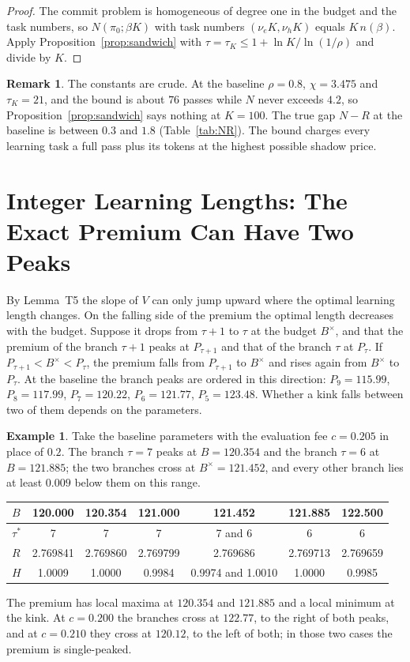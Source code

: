\documentclass[11pt]{article}
\theoremstyle{definition}
\newtheorem{example}{Example}
\newtheorem{remark}{Remark}
\begin{document}
\begin{proof}
The commit problem is homogeneous of degree one in the budget and the task numbers, so $N(\pi_0;\beta K)$ with task numbers $(\nu_eK,\nu_hK)$ equals $K\,n(\beta)$. Apply Proposition~\ref{prop:sandwich} with $\tau=\tau_K\le1+\ln K/\ln(1/\rho)$ and divide by $K$.
\end{proof}

\begin{remark}
The constants are crude. At the baseline $\rho=0.8$, $\chi=3.475$ and $\tau_K=21$, and the bound is about $76$ passes while $N$ never exceeds $4.2$, so Proposition~\ref{prop:sandwich} says nothing at $K=100$. The true gap $N-R$ at the baseline is between $0.3$ and $1.8$ (Table~\ref{tab:NR}). The bound charges every learning task a full pass plus its tokens at the highest possible shadow price.
\end{remark}

\section{Integer Learning Lengths: The Exact Premium Can Have Two Peaks}

By Lemma~T5 the slope of $V$ can only jump upward where the optimal learning length changes. On the falling side of the premium the optimal length decreases with the budget. Suppose it drops from $\tau+1$ to $\tau$ at the budget $B^\times$, and that the premium of the branch $\tau+1$ peaks at $P_{\tau+1}$ and that of the branch $\tau$ at $P_\tau$. If $P_{\tau+1}<B^\times<P_\tau$, the premium falls from $P_{\tau+1}$ to $B^\times$ and rises again from $B^\times$ to $P_\tau$. At the baseline the branch peaks are ordered in this direction: $P_9=115.99$, $P_8=117.99$, $P_7=120.22$, $P_6=121.77$, $P_5=123.48$. Whether a kink falls between two of them depends on the parameters.

\begin{example}\label{ex:scallop}
Take the baseline parameters with the evaluation fee $c=0.205$ in place of $0.2$. The branch $\tau=7$ peaks at $B=120.354$ and the branch $\tau=6$ at $B=121.885$; the two branches cross at $B^\times=121.452$, and every other branch lies at least $0.009$ below them on this range.
\begin{center}
\small
\begin{tabular}{@{}lcccccc@{}}
\toprule
$B$ & 120.000 & 120.354 & 121.000 & 121.452 & 121.885 & 122.500 \\
\midrule
$\tau^*$ & 7 & 7 & 7 & 7 and 6 & 6 & 6 \\
$R$ & 2.769841 & 2.769860 & 2.769799 & 2.769686 & 2.769713 & 2.769659 \\
$H$ & 1.0009 & 1.0000 & 0.9984 & 0.9974 and 1.0010 & 1.0000 & 0.9985 \\
\bottomrule
\end{tabular}
\end{center}
The premium has local maxima at $120.354$ and $121.885$ and a local minimum at the kink. At $c=0.200$ the branches cross at $122.77$, to the right of both peaks, and at $c=0.210$ they cross at $120.12$, to the left of both; in those two cases the premium is single-peaked.
\end{example}
\end{document}
